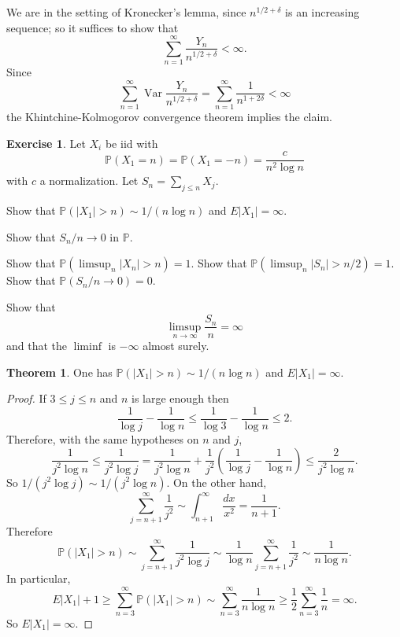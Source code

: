 \documentclass[10pt]{article}
\newcommand{\PP}{\mathbb P}
\newcommand{\Var}{\operatorname{Var}}
\theoremstyle{definition}
\newtheorem{exer}{Exercise}
\newtheorem{theorem}[lemma]{Theorem}
\begin{document}
We are in the setting of Kronecker's lemma, since $n^{1/2+\delta}$ is an increasing sequence; so it suffices to show that
$$\sum_{n=1}^\infty \frac{Y_n}{n^{1/2+\delta}} < \infty.$$
Since
$$\sum_{n=1}^\infty \Var \frac{Y_n}{n^{1/2+\delta}} = \sum_{n=1}^\infty \frac{1}{n^{1+2\delta}} < \infty$$
the Khintchine-Kolmogorov convergence theorem implies the claim.

\begin{exer}
Let $X_i$ be iid with
$$\PP(X_1 = n) = \PP(X_1 = -n) = \frac{c}{n^2 \log n}$$
with $c$ a normalization. Let $S_n = \sum_{j \leq n} X_j$.

Show that $\PP(|X_1| > n) \sim 1/(n \log n)$ and $E|X_1| = \infty$.

Show that $S_n/n \to 0$ in $\PP$.

Show that $\PP(\limsup_n |X_n| > n) = 1$. Show that $\PP(\limsup_n |S_n| > n/2) = 1$. Show that $\PP(S_n/n \to 0) = 0$.

Show that
$$\limsup_{n \to \infty} \frac{S_n}{n} = \infty$$
and that the $\liminf$ is $-\infty$ almost surely.
\end{exer}

\begin{theorem}
One has $\PP(|X_1| > n) \sim 1/(n \log n)$ and $E|X_1| = \infty$.
\end{theorem}
\begin{proof}
If $3 \leq j \leq n$ and $n$ is large enough then
$$\frac{1}{\log j} - \frac{1}{\log n} \leq \frac{1}{\log 3} - \frac{1}{\log n} \leq 2.$$
Therefore, with the same hypotheses on $n$ and $j$,
$$\frac{1}{j^2 \log n} \leq \frac{1}{j^2 \log j} = \frac{1}{j^2 \log n} + \frac{1}{j^2} \left(\frac{1}{\log j} - \frac{1}{\log n}\right) \leq \frac{2}{j^2 \log n}.$$
So $1/(j^2 \log j) \sim 1/(j^2 \log n)$. On the other hand,
$$\sum_{j=n+1}^\infty \frac{1}{j^2} \sim \int_{n+1}^\infty \frac{dx}{x^2} = \frac{1}{n + 1}.$$
Therefore
$$\PP(|X_1| > n) \sim \sum_{j=n+1}^\infty \frac{1}{j^2 \log j} \sim \frac{1}{\log n} \sum_{j=n+1}^\infty \frac{1}{j^2} \sim \frac{1}{n \log n}.$$
In particular,
$$E|X_1| + 1 \geq \sum_{n=3}^\infty \PP(|X_1| > n) \sim \sum_{n=3}^\infty \frac{1}{n \log n} \geq \frac{1}{2} \sum_{n=3}^\infty \frac{1}{n} = \infty.$$
So $E|X_1| = \infty$.
\end{proof}
\end{document}
